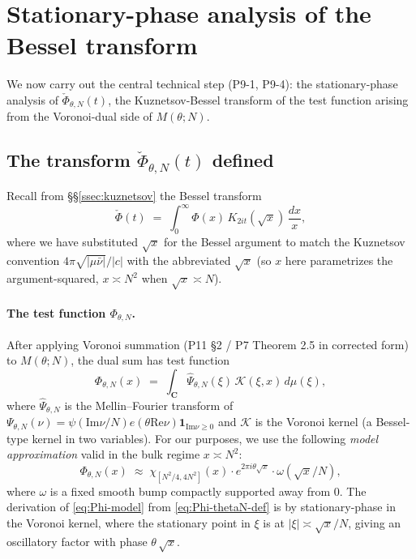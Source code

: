 \documentclass[11pt]{article}
\theoremstyle{definition}
\newcommand{\C}{\mathbf{C}}
\renewcommand{\Re}{\mathrm{Re}}
\renewcommand{\Im}{\mathrm{Im}}
\begin{document}
\medskip

\section{Stationary-phase analysis of the Bessel transform}\label{sec:phase}

We now carry out the central technical step (P9-1, P9-4): the stationary-phase analysis of $\check\Phi_{\theta,N}(t)$, the Kuznetsov-Bessel transform of the test function arising from the Voronoi-dual side of $M(\theta;N)$.

\subsection{The transform $\check\Phi_{\theta,N}(t)$ defined}\label{ssec:transform-def}

Recall from \S\S\ref{ssec:kuznetsov} the Bessel transform
\[
   \check\Phi(t) \;=\; \int_0^\infty \Phi(x)\, K_{2it}(\sqrt x)\,\frac{dx}{x},
\]
where we have substituted $\sqrt x$ for the Bessel argument to match the Kuznetsov convention $4\pi\sqrt{|\mu\bar\nu|}/|c|$ with the abbreviated $\sqrt x$ (so $x$ here parametrizes the argument-squared, $x \asymp N^2$ when $\sqrt x \asymp N$).

\paragraph{The test function $\Phi_{\theta,N}$.}
After applying Voronoi summation (P11 \S2 / P7 Theorem 2.5 in corrected form) to $M(\theta;N)$, the dual sum has test function
\begin{equation}\label{eq:Phi-thetaN-def}
   \Phi_{\theta,N}(x) \;=\; \int_\C \widehat\Psi_{\theta,N}(\xi)\, \mathcal{K}(\xi, x)\, d\mu(\xi),
\end{equation}
where $\widehat\Psi_{\theta,N}$ is the Mellin--Fourier transform of $\Psi_{\theta,N}(\nu) = \psi(\Im\nu/N)e(\theta\Re\nu)\mathbf{1}_{\Im\nu \ge 0}$ and $\mathcal{K}$ is the Voronoi kernel (a Bessel-type kernel in two variables). For our purposes, we use the following \emph{model approximation} valid in the bulk regime $x \asymp N^2$:
\begin{equation}\label{eq:Phi-model}
   \Phi_{\theta,N}(x) \;\approx\; \chi_{[N^2/4, 4N^2]}(x)\cdot e^{2\pi i \theta \sqrt x}\cdot \omega(\sqrt x / N),
\end{equation}
where $\omega$ is a fixed smooth bump compactly supported away from 0. The derivation of \eqref{eq:Phi-model} from \eqref{eq:Phi-thetaN-def} is by stationary-phase in the Voronoi kernel, where the stationary point in $\xi$ is at $|\xi| \asymp \sqrt x/N$, giving an oscillatory factor with phase $\theta\,\sqrt x$.
\end{document}
